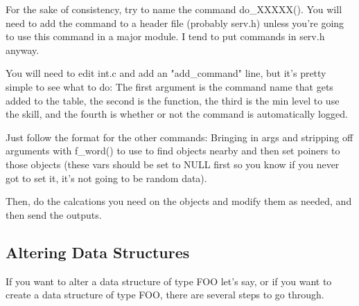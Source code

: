 For the sake of consistency, try to name the command do\_XXXXX(). 
You will need to add the command to a header file (probably serv.h)
unless you're going to use this command in a major module. I tend
to put commands in serv.h anyway.

You will need to edit int.c and add an "add\_command" line, but
it's pretty simple to see what to do: The first argument is the
command name that gets added to the table, the second is the function,
the third is the min level to use the skill, and the fourth is
whether or not the command is automatically logged.

Just follow the format for the other commands: Bringing in args and
stripping off arguments with f\_word() to use to find objects nearby
and then set poiners to those objects (these vars should be set to
NULL first so you know if you never got to set it, it's not going to be
random data).

Then, do the calcations you need on the objects and modify them as
needed, and then send the outputs.

\subsection{Altering Data Structures}

If you want to alter a data structure of type FOO let's say, or if you
want to create a data structure of type FOO, there are several steps
to go through.

